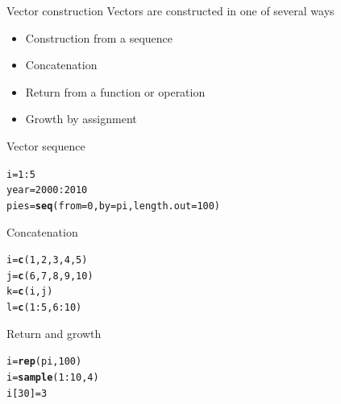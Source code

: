 \documentclass[xcolor=dvipsnames]{beamer}
\makeatletter
\newcommand{\hlnum}[1]{\textcolor[rgb]{0.686,0.059,0.569}{#1}}%
\newcommand{\hlopt}[1]{\textcolor[rgb]{0,0,0}{#1}}%
\newcommand{\hlstd}[1]{\textcolor[rgb]{0.345,0.345,0.345}{#1}}%
\newcommand{\hlkwb}[1]{\textcolor[rgb]{0.69,0.353,0.396}{#1}}%
\newcommand{\hlkwc}[1]{\textcolor[rgb]{0.333,0.667,0.333}{#1}}%
\newcommand{\hlkwd}[1]{\textcolor[rgb]{0.737,0.353,0.396}{\textbf{#1}}}%
\newenvironment{kframe}{%
 \def\at@end@of@kframe{}%
 \ifinner\ifhmode%
  \def\at@end@of@kframe{\end{minipage}}%
  \begin{minipage}{\columnwidth}%
 \fi\fi%
 \def\FrameCommand##1{\hskip\@totalleftmargin \hskip-\fboxsep
 \colorbox{shadecolor}{##1}\hskip-\fboxsep
     \hskip-\linewidth \hskip-\@totalleftmargin \hskip\columnwidth}%
 \MakeFramed {\advance\hsize-\width
   \@totalleftmargin\z@ \linewidth\hsize
   \@setminipage}}%
 {\par\unskip\endMakeFramed%
 \at@end@of@kframe}
\newenvironment{knitrout}{}{} %
\makeatother
\begin{document}
\begin{frame}[fragile]{Vector construction}
  Vectors are constructed in one of several ways
  \begin{itemize}
    \item Construction from a sequence
    \item Concatenation
    \item Return from a function or operation
    \item Growth by assignment
  \end{itemize}
\end{frame}

\begin{frame}[fragile]{Vector sequence}
\begin{knitrout}
\color{fgcolor}\begin{kframe}
\begin{alltt}
\hlstd{i} \hlkwb{=} \hlnum{1}\hlopt{:}\hlnum{5}
\hlstd{year} \hlkwb{=} \hlnum{2000}\hlopt{:}\hlnum{2010}
\hlstd{pies} \hlkwb{=} \hlkwd{seq}\hlstd{(}\hlkwc{from} \hlstd{=} \hlnum{0}\hlstd{,} \hlkwc{by} \hlstd{= pi,} \hlkwc{length.out} \hlstd{=} \hlnum{100}\hlstd{)}
\end{alltt}
\end{kframe}
\end{knitrout}

\end{frame}

\begin{frame}[fragile]{Concatenation}
\begin{knitrout}
\color{fgcolor}\begin{kframe}
\begin{alltt}
\hlstd{i} \hlkwb{=} \hlkwd{c}\hlstd{(}\hlnum{1}\hlstd{,} \hlnum{2}\hlstd{,} \hlnum{3}\hlstd{,} \hlnum{4}\hlstd{,} \hlnum{5}\hlstd{)}
\hlstd{j} \hlkwb{=} \hlkwd{c}\hlstd{(}\hlnum{6}\hlstd{,} \hlnum{7}\hlstd{,} \hlnum{8}\hlstd{,} \hlnum{9}\hlstd{,} \hlnum{10}\hlstd{)}
\hlstd{k} \hlkwb{=} \hlkwd{c}\hlstd{(i, j)}
\hlstd{l} \hlkwb{=} \hlkwd{c}\hlstd{(}\hlnum{1}\hlopt{:}\hlnum{5}\hlstd{,} \hlnum{6}\hlopt{:}\hlnum{10}\hlstd{)}
\end{alltt}
\end{kframe}
\end{knitrout}

\end{frame}

\begin{frame}[fragile]{Return and growth}
\begin{knitrout}
\color{fgcolor}\begin{kframe}
\begin{alltt}
\hlstd{i} \hlkwb{=} \hlkwd{rep}\hlstd{(pi,} \hlnum{100}\hlstd{)}
\hlstd{i} \hlkwb{=} \hlkwd{sample}\hlstd{(}\hlnum{1}\hlopt{:}\hlnum{10}\hlstd{,} \hlnum{4}\hlstd{)}
\hlstd{i[}\hlnum{30}\hlstd{]} \hlkwb{=} \hlnum{3}
\end{alltt}
\end{kframe}
\end{knitrout}

\end{frame}
\end{document}
